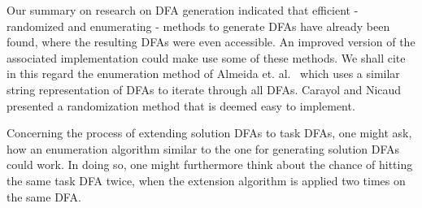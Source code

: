 Our summary on research on DFA generation indicated that efficient - randomized and enumerating - methods to generate DFAs have already been found, where the resulting DFAs were even accessible. An improved version of the associated implementation could make use some of these methods. We shall cite in this regard the enumeration method of Almeida et. al.~\cite{AAA09} which uses a similar string representation of DFAs to iterate through all DFAs. Carayol and Nicaud~\cite{CN12} presented a randomization method that is deemed easy to implement.

Concerning the process of extending solution DFAs to task DFAs, one might ask, how an enumeration algorithm similar to the one for generating solution DFAs could work. In doing so, one might furthermore think about the chance of hitting the same task DFA twice, when the extension algorithm is applied two times on the same DFA.
